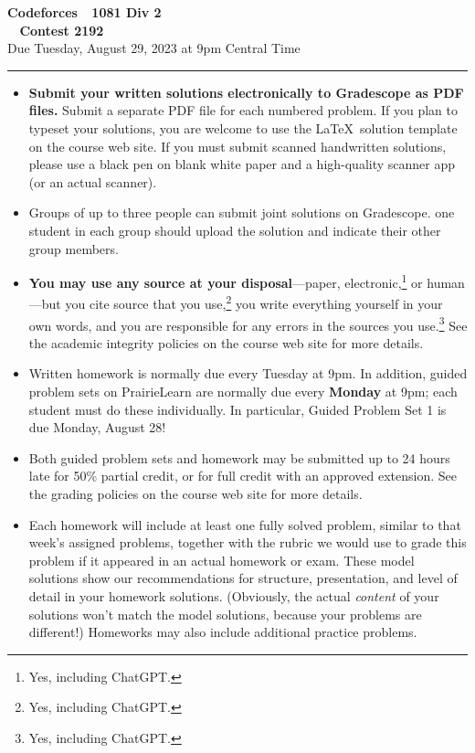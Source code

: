 \documentclass[11pt]{article}
\begin{document}
\thispagestyle{empty}

\begin{center}
\Large\textbf{Codeforces \,\decosix\, 1081 Div 2}%
\\
\LARGE\textbf{\decothreeleft~ Contest 2192 ~\decothreeright}%
\\[0.5ex]
\large Due Tuesday, August 29, 2023 at 9pm Central Time
\end{center}

\bigskip
\hrule
\bigskip
\begin{itemize}

\item
\textbf{Submit your written solutions electronically to Gradescope as PDF files.}  Submit a separate PDF file for each numbered problem.  If you plan to typeset your solutions, you are welcome to use the \LaTeX\ solution template on the course web site.  If you must submit scanned handwritten solutions, please use a black pen on blank white paper and a high-quality scanner app (or an actual scanner).

\item
Groups of up to three people can submit joint solutions on Gradescope.   one student in each group should upload the solution and indicate their other group members.

\item
\textbf{You may use any source at your disposal}—paper, electronic,\footnote{Yes, including ChatGPT.} or human—but you  cite  source that you use,\footnote{Yes, including ChatGPT.} you  write everything yourself in your own words, and you are responsible for any errors in the sources you use.\footnote{Yes, including ChatGPT.}  See the academic integrity policies on the course web site for more details. 

\item
Written homework is normally due every Tuesday at 9pm.  In addition, guided problem sets on PrairieLearn are normally due every \textbf{Monday} at 9pm; each student must do these individually.  In particular, Guided Problem Set 1 is due Monday, August 28!  

\item
Both guided problem sets and homework may be submitted up to 24 hours late for 50\% partial credit, or for full credit with an approved extension. See the grading policies on the course web site for more details.

\item
Each homework will include at least one fully solved problem, similar to that week’s   assigned problems, together with the rubric we would use to grade this problem if it appeared in an actual homework or exam.  These model solutions show our recommendations for structure, presentation, and level of detail in your homework solutions.  (Obviously, the actual \emph{content} of your solutions won’t match the model solutions, because your problems are different!)  Homeworks may also include additional practice problems.


\end{itemize}
\end{document}
